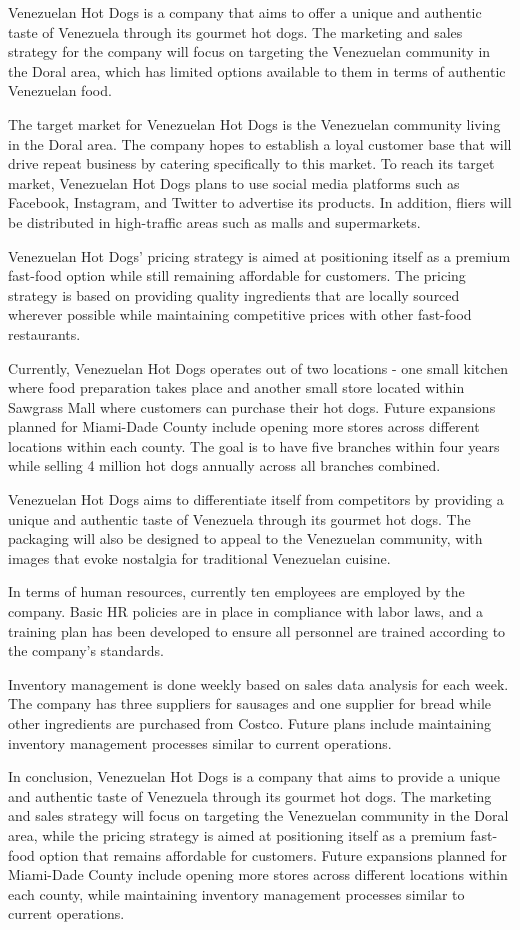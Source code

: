 Venezuelan Hot Dogs is a company that aims to offer a unique and authentic taste of Venezuela through its gourmet hot dogs. The marketing and sales strategy for the company will focus on targeting the Venezuelan community in the Doral area, which has limited options available to them in terms of authentic Venezuelan food.

The target market for Venezuelan Hot Dogs is the Venezuelan community living in the Doral area. The company hopes to establish a loyal customer base that will drive repeat business by catering specifically to this market. To reach its target market, Venezuelan Hot Dogs plans to use social media platforms such as Facebook, Instagram, and Twitter to advertise its products. In addition, fliers will be distributed in high-traffic areas such as malls and supermarkets.

Venezuelan Hot Dogs' pricing strategy is aimed at positioning itself as a premium fast-food option while still remaining affordable for customers. The pricing strategy is based on providing quality ingredients that are locally sourced wherever possible while maintaining competitive prices with other fast-food restaurants.

Currently, Venezuelan Hot Dogs operates out of two locations - one small kitchen where food preparation takes place and another small store located within Sawgrass Mall where customers can purchase their hot dogs. Future expansions planned for Miami-Dade County include opening more stores across different locations within each county. The goal is to have five branches within four years while selling 4 million hot dogs annually across all branches combined.

Venezuelan Hot Dogs aims to differentiate itself from competitors by providing a unique and authentic taste of Venezuela through its gourmet hot dogs. The packaging will also be designed to appeal to the Venezuelan community, with images that evoke nostalgia for traditional Venezuelan cuisine.

In terms of human resources, currently ten employees are employed by the company. Basic HR policies are in place in compliance with labor laws, and a training plan has been developed to ensure all personnel are trained according to the company's standards.

Inventory management is done weekly based on sales data analysis for each week. The company has three suppliers for sausages and one supplier for bread while other ingredients are purchased from Costco. Future plans include maintaining inventory management processes similar to current operations.

In conclusion, Venezuelan Hot Dogs is a company that aims to provide a unique and authentic taste of Venezuela through its gourmet hot dogs. The marketing and sales strategy will focus on targeting the Venezuelan community in the Doral area, while the pricing strategy is aimed at positioning itself as a premium fast-food option that remains affordable for customers. Future expansions planned for Miami-Dade County include opening more stores across different locations within each county, while maintaining inventory management processes similar to current operations.